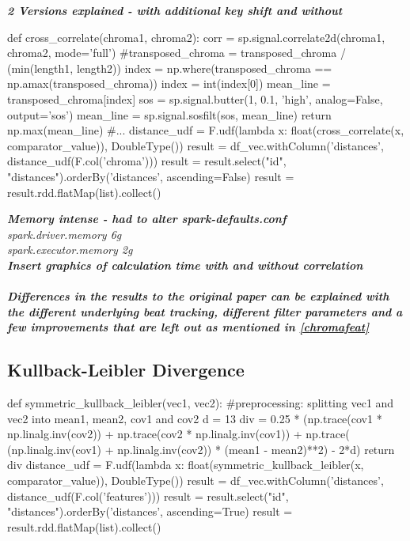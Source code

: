 \textit{\textbf{2 Versions explained - with additional key shift and without}}
\begin{pythonCode}[frame=single,label={lst:corr},caption={cross-correlation},captionpos=b]
def cross_correlate(chroma1, chroma2):
    corr = sp.signal.correlate2d(chroma1, chroma2, mode='full')
    #transposed_chroma = transposed_chroma / (min(length1, length2))
    index = np.where(transposed_chroma == np.amax(transposed_chroma))
    index = int(index[0])
    mean_line = transposed_chroma[index]
    sos = sp.signal.butter(1, 0.1, 'high', analog=False, output='sos')
    mean_line = sp.signal.sosfilt(sos, mean_line)
    return np.max(mean_line)
#...
distance_udf = F.udf(lambda x: float(cross_correlate(x, comparator_value)), DoubleType())
result = df_vec.withColumn('distances', distance_udf(F.col('chroma')))
result = result.select("id", "distances").orderBy('distances', ascending=False)
result = result.rdd.flatMap(list).collect()
\end{pythonCode}

\noindent\textbf{\textit{Memory intense - had to alter spark-defaults.conf\\}}
\textit{spark.driver.memory             6g\\
spark.executor.memory           2g\\
}
\noindent\textbf{\textit{Insert graphics of calculation time with and without correlation\\}}
\ \\
\noindent\textbf{\textit{Differences in the results to the original paper can be explained with the different underlying beat tracking, different filter parameters and a few improvements that are left out as mentioned in \ref{chromafeat}}\cite{cover802}}

\subsection{Kullback-Leibler Divergence}

\begin{pythonCode}[frame=single,label={lst:kl},caption={kullback leibler},captionpos=b]
def symmetric_kullback_leibler(vec1, vec2):
	#preprocessing: splitting vec1 and vec2 into mean1, mean2, cov1 and cov2
    d = 13
    div = 0.25 * (np.trace(cov1 * np.linalg.inv(cov2)) + np.trace(cov2 * np.linalg.inv(cov1)) + np.trace( (np.linalg.inv(cov1) + np.linalg.inv(cov2)) * (mean1 - mean2)**2) - 2*d)
    return div
distance_udf = F.udf(lambda x: float(symmetric_kullback_leibler(x, comparator_value)), DoubleType())
result = df_vec.withColumn('distances', distance_udf(F.col('features')))
result = result.select("id", "distances").orderBy('distances', ascending=True)
result = result.rdd.flatMap(list).collect()
\end{pythonCode}

